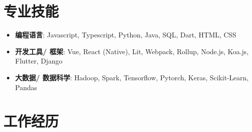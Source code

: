 \documentclass[11pt,a4paper,sans]{moderncv}        %
\begin{document}
\makecvtitle
\vspace{-3.5em}
\section{专业技能}

\vspace{2pt}

\begin{itemize}

\item{\textbf{编程语言}: Javascript, Typescript, Python, Java, SQL, Dart, HTML, CSS }
\vspace{2pt}
\item{\textbf{开发工具/ 框架}: Vue, React (Native), Lit, Webpack, Rollup, Node.js, Koa.js, Flutter, Django }
\item{\textbf{大数据/ 数据科学}: Hadoop, Spark, Tensorflow, Pytorch, Keras, Scikit-Learn, Pandas}
\end{itemize}

\section{工作经历	}
\end{document}
